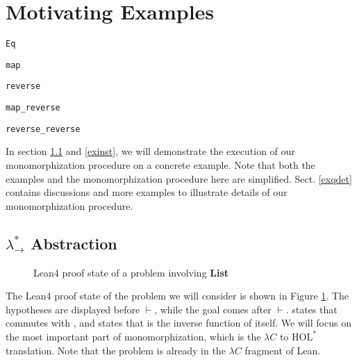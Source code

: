 \section{Motivating Examples} \label{motex}

\begin{lrbox}{\vEq} {\color{hypcolor} \verb|Eq|} \end{lrbox}
\begin{lrbox}{\vmap} {\color{hypcolor} \verb|map|} \end{lrbox}
\begin{lrbox}{\vrev} {\color{hypcolor} \verb|reverse|} \end{lrbox}
\begin{lrbox}{\vmaprev} {\color{hypcolor} \verb|map_reverse|} \end{lrbox}
\begin{lrbox}{\vrevrev} {\color{hypcolor} \verb|reverse_reverse|} \end{lrbox}

In section \ref{exabst} and \ref{exinst}, we will demonstrate the execution of our monomorphization procedure on a
concrete example. Note that both the examples and the monomorphization procedure
here are simplified. Sect. \ref{exqdet} contains discussions and more examples
to illustrate details of our monomorphization procedure.

\subsection{$\lambda_\to^*$ Abstraction} \label{exabst}

\begin{figure}
  \begin{CenteredBox}
    
  \end{CenteredBox}
  \caption{Lean4 proof state of a problem involving \textbf{List}} \label{leanlistpretty}
\end{figure}

The Lean4 proof state of the problem we will consider is shown in Figure \ref{leanlistpretty}.
The hypotheses are displayed before $\vdash$, while the goal comes after $\vdash$.
\usebox{\vmaprev} states that \usebox{\vmap} commutes with \usebox{\vrev}, and
\usebox{\vrevrev} states that \usebox{\vrev} is the inverse function of itself.
We will focus on the most important part of monomorphization, which is the
$\lambda C$ to $\text{HOL}^*$ translation. Note that the problem is already in the
$\lambda C$ fragment of Lean.

